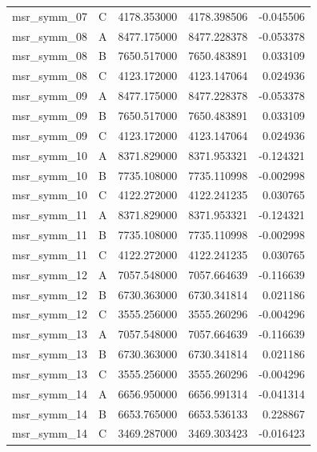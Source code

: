 \begin{longtable}{llrrr}
msr\_symm\_07 & C & 4178.353000 & 4178.398506 & -0.045506 \\
msr\_symm\_08 & A & 8477.175000 & 8477.228378 & -0.053378 \\
msr\_symm\_08 & B & 7650.517000 & 7650.483891 & 0.033109 \\
msr\_symm\_08 & C & 4123.172000 & 4123.147064 & 0.024936 \\
msr\_symm\_09 & A & 8477.175000 & 8477.228378 & -0.053378 \\
msr\_symm\_09 & B & 7650.517000 & 7650.483891 & 0.033109 \\
msr\_symm\_09 & C & 4123.172000 & 4123.147064 & 0.024936 \\
msr\_symm\_10 & A & 8371.829000 & 8371.953321 & -0.124321 \\
msr\_symm\_10 & B & 7735.108000 & 7735.110998 & -0.002998 \\
msr\_symm\_10 & C & 4122.272000 & 4122.241235 & 0.030765 \\
msr\_symm\_11 & A & 8371.829000 & 8371.953321 & -0.124321 \\
msr\_symm\_11 & B & 7735.108000 & 7735.110998 & -0.002998 \\
msr\_symm\_11 & C & 4122.272000 & 4122.241235 & 0.030765 \\
msr\_symm\_12 & A & 7057.548000 & 7057.664639 & -0.116639 \\
msr\_symm\_12 & B & 6730.363000 & 6730.341814 & 0.021186 \\
msr\_symm\_12 & C & 3555.256000 & 3555.260296 & -0.004296 \\
msr\_symm\_13 & A & 7057.548000 & 7057.664639 & -0.116639 \\
msr\_symm\_13 & B & 6730.363000 & 6730.341814 & 0.021186 \\
msr\_symm\_13 & C & 3555.256000 & 3555.260296 & -0.004296 \\
msr\_symm\_14 & A & 6656.950000 & 6656.991314 & -0.041314 \\
msr\_symm\_14 & B & 6653.765000 & 6653.536133 & 0.228867 \\
msr\_symm\_14 & C & 3469.287000 & 3469.303423 & -0.016423 \\
\bottomrule
\end{longtable}
